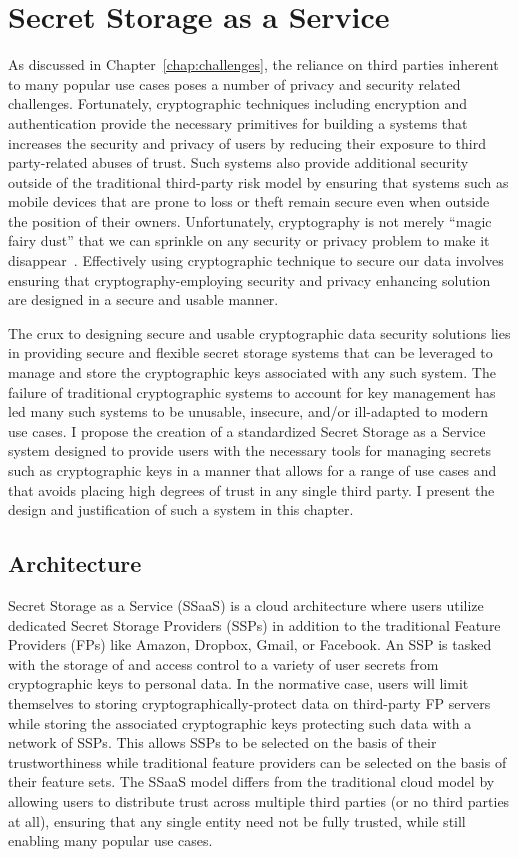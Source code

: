 \chapter{Secret Storage as a Service}
\label{chap:ssaas}

As discussed in Chapter~\ref{chap:challenges}, the reliance on third
parties inherent to many popular use cases poses a number of privacy
and security related challenges. Fortunately, cryptographic techniques
including encryption and authentication provide the necessary
primitives for building a systems that increases the security and
privacy of users by reducing their exposure to third party-related
abuses of trust. Such systems also provide additional security outside
of the traditional third-party risk model by ensuring that systems
such as mobile devices that are prone to loss or theft remain secure
even when outside the position of their owners. Unfortunately,
cryptography is not merely ``magic fairy dust'' that we can sprinkle
on any security or privacy problem to make it
disappear~\cite{smith2003}. Effectively using cryptographic technique
to secure our data involves ensuring that cryptography-employing
security and privacy enhancing solution are designed in a secure and
usable manner.

The crux to designing secure and usable cryptographic data security
solutions lies in providing secure and flexible secret storage systems
that can be leveraged to manage and store the cryptographic keys
associated with any such system. The failure of traditional
cryptographic systems to account for key management has led many such
systems to be unusable, insecure, and/or ill-adapted to modern use
cases. I propose the creation of a standardized Secret Storage as a
Service system designed to provide users with the necessary tools for
managing secrets such as cryptographic keys in a manner that allows
for a range of use cases and that avoids placing high degrees of trust
in any single third party. I present the design and justification of
such a system in this chapter.

\section{Architecture}
\label{chap:ssaas:arch}

Secret Storage as a Service (SSaaS) is a cloud architecture where
users utilize dedicated Secret Storage Providers (SSPs) in addition to
the traditional Feature Providers (FPs) like Amazon, Dropbox, Gmail,
or Facebook. An SSP is tasked with the storage of and access control
to a variety of user secrets from cryptographic keys to personal
data. In the normative case, users will limit themselves to storing
cryptographically-protect data on third-party FP servers while storing
the associated cryptographic keys protecting such data with a network
of SSPs. This allows SSPs to be selected on the basis of their
trustworthiness while traditional feature providers can be selected on
the basis of their feature sets. The SSaaS model differs from the
traditional cloud model by allowing users to distribute trust across
multiple third parties (or no third parties at all), ensuring that any
single entity need not be fully trusted, while still enabling many
popular use cases.

